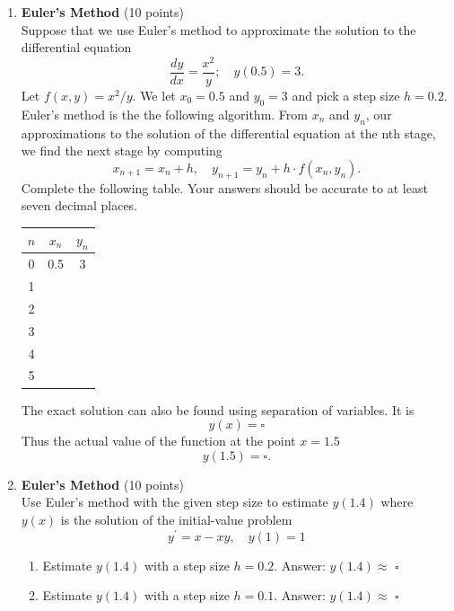 \begin{enumerate}
  \item \textbf{Euler's Method} (10 points)\\
  Suppose that we use Euler's method to approximate the solution to the differential equation
  $$
  \frac{d y}{d x}=\frac{x^2}{y} ; \quad y(0.5)=3 .
  $$
  Let $f(x, y)=x^2 / y$.
  We let $x_0=0.5$ and $y_0=3$ and pick a step size $h=0.2$. Euler's method is the the following algorithm. From $x_n$ and $y_n$, our approximations to the solution of the differential equation at the nth stage, we find the next stage by computing
  $$
  x_{n+1}=x_n+h, \quad y_{n+1}=y_n+h \cdot f\left(x_n, y_n\right) .
  $$
  Complete the following table. Your answers should be accurate to at least seven decimal places.
  \begin{tabular}{|c|c|c|}
  \hline$n$ & $x_n$ & $y_n$ \\
  \hline 0 & 0.5 & 3 \\
  \hline 1 & & \\
  \hline 2 & & \\
  \hline 3 & & \\
  \hline 4 & & \\
  \hline 5 & & \\
  \hline
  \end{tabular}
  The exact solution can also be found using separation of variables. It is
  $$
  y(x)=\square
  $$
  Thus the actual value of the function at the point $x=1.5$
  $$
  y(1.5)=\square .
  $$
  \begin{subanswer}
  \end{subanswer}

  \item \textbf{Euler's Method} (10 points)\\
  Use Euler's method with the given step size to estimate $y(1.4)$ where $y(x)$ is the solution of the initial-value problem
  $$
  y^{\prime}=x-x y, \quad y(1)=1
  $$
  \begin{enumerate}[label=\alph*]
    \item Estimate $y(1.4)$ with a step size $h=0.2$.
    Answer: $y(1.4) \approx$ $\square$
    \begin{subanswer}
    \end{subanswer}
    \item Estimate $y(1.4)$ with a step size $h=0.1$.
    Answer: $y(1.4) \approx$ $\square$
    \begin{subanswer}
    \end{subanswer}
  \end{enumerate}


\end{enumerate}
